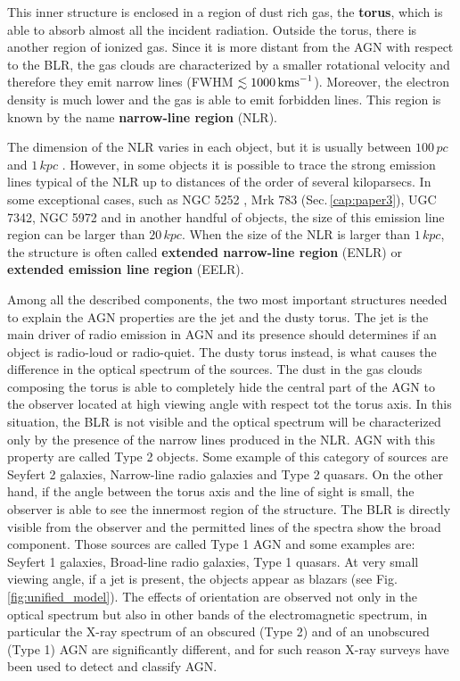 \documentclass[../thesis.tex]{subfiles}
\begin{document}
This inner structure is enclosed in a region of dust rich gas, the \textbf{torus}, which is able to absorb almost all the incident radiation.
Outside the torus, there is another region of ionized gas.
Since it is more distant from the AGN with respect to the BLR, the gas clouds are characterized by a smaller rotational velocity and therefore they emit narrow lines (FWHM $\lesssim 1000\,\si{\kms}$).
Moreover, the electron density is much lower and the gas is able to emit forbidden lines.
This region is known by the name \textbf{narrow-line region} (NLR).

The dimension of the NLR varies in each object, but it is usually between $100\,\si{pc}$ and $1\,\si{kpc}$ \citep{Beckmann12}.
However, in some objects it is possible to trace the strong emission lines typical of the NLR up to distances of the order of several kiloparsecs.
In some exceptional cases, such as NGC 5252 \citep{Tadhunter89}, Mrk 783 (Sec.\,\ref{cap:paper3}), UGC 7342, NGC 5972 \citep{Keel12} and in another handful of objects, the size of this emission line region can be larger than $20\,\si{kpc}$.
When the size of the NLR is larger than $1\,\si{kpc}$, the structure is often called \textbf{extended narrow-line region} (ENLR) or \textbf{extended emission line region} (EELR).

Among all the described components, the two most important structures needed to explain the AGN properties are the jet and the dusty torus.
The jet is the main driver of radio emission in AGN and its presence should determines if an object is radio-loud or radio-quiet.
The dusty torus instead, is what causes the difference in the optical spectrum of the sources.
The dust in the gas clouds composing the torus is able to completely hide the central part of the AGN to the observer located at high viewing angle with respect tot the torus axis.
In this situation, the BLR is not visible and the optical spectrum will be characterized only by the presence of the narrow lines produced in the NLR.
AGN with this property are called Type 2 objects.
Some example of this category of sources are Seyfert 2 galaxies, Narrow-line radio galaxies and Type 2 quasars.
On the other hand, if the angle between the torus axis and the line of sight is small, the observer is able to see the innermost region of the structure.
The BLR is directly visible from the observer and the permitted lines of the spectra show the broad component.
Those sources are called Type 1 AGN and some examples are: Seyfert 1 galaxies, Broad-line radio galaxies, Type 1 quasars.
At very small viewing angle, if a jet is present, the objects appear as blazars (see Fig.\,\ref{fig:unified_model}).
The effects of orientation are observed not only in the optical spectrum but also in other bands of the electromagnetic spectrum, in particular the X-ray spectrum of an obscured (Type 2) and of an unobscured (Type 1) AGN are significantly different, and for such reason X-ray surveys have been used to detect and classify AGN. 
\end{document}
